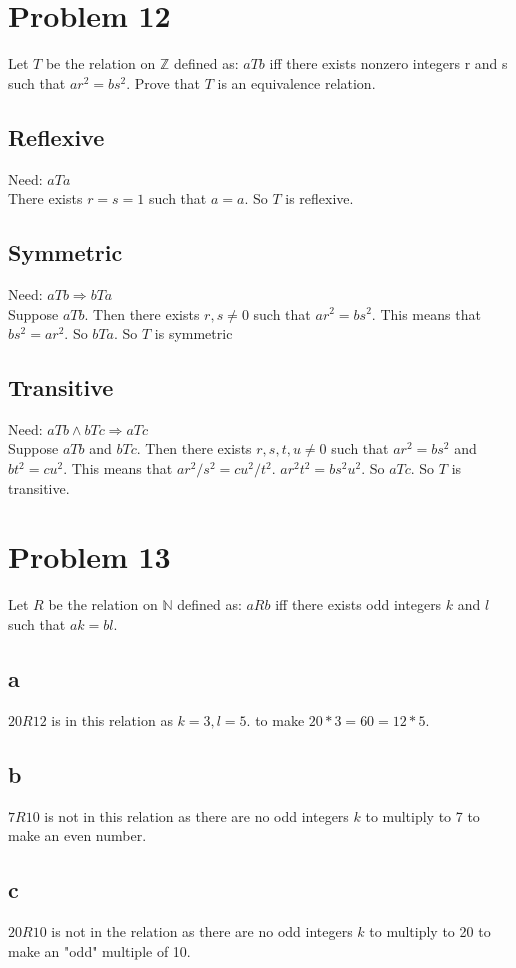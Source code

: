 \documentclass{article}
\begin{document}
\section*{Problem 12}
Let $T$ be the relation on $\mathbb{Z}$ defined as: $aTb$ iff there exists nonzero integers r and s such that $ar^2 = bs^2$. Prove that $T$ is an equivalence relation.
\subsection*{Reflexive}
Need: $aTa$ \\
There exists $r = s = 1$ such that $a = a$. So $T$ is reflexive.
\subsection*{Symmetric}
Need: $aTb \Rightarrow bTa$ \\
Suppose $aTb$. Then there exists $r, s \neq 0$ such that $ar^2 = bs^2$. This means that $bs^2 = ar^2$. So $bTa$. So $T$ is symmetric
\subsection*{Transitive}
Need: $aTb \land bTc \Rightarrow aTc$ \\
Suppose $aTb$ and $bTc$. Then there exists $r, s, t, u \neq 0$ such that $ar^2 = bs^2$ and $bt^2 = cu^2$. This means that $ar^2 / s^2 = cu^2 / t^2$. $ar^2t^2 = bs^2u^2$. So $aTc$. So $T$ is transitive.\\
\section*{Problem 13}
Let $R$ be the relation on $\mathbb{N}$ defined as: $aRb$ iff there exists odd integers $k$ and $l$ such that $ak =bl$.
\subsection*{a}
$20R12$ is in this relation as $k = 3, l = 5$. to make $20*3 = 60 = 12*5$.\\
\subsection*{b}
$7R10$ is not in this relation as there are no odd integers $k$ to multiply to 7 to make an even number.\\
\subsection*{c}
$20R10$ is not in the relation as there are no odd integers $k$ to multiply to 20 to make an "odd" multiple of 10.\\
\end{document}
